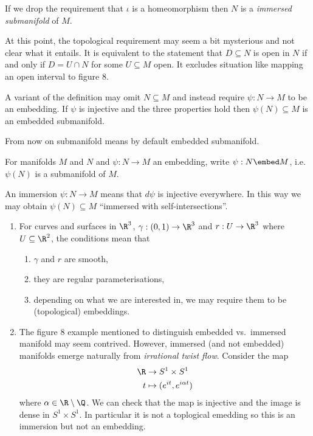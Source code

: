 \documentclass[a4paper]{article}
\begin{document}
\begin{definition}
  If we drop the requirement that \(\iota\) is a homeomorphism then \(N\) is a \emph{immersed submanifold} of \(M\).
\end{definition}

At this point, the topological requirement may seem a bit mysterious and not clear what it entails. It is equivalent to the statement that \(D \subseteq N\) is open in \(N\) if and only if \(D = U \cap N\) for some \(U \subseteq M\) open. It excludes situation like mapping an open interval to figure 8.

A variant of the definition may omit \(N \subseteq M\) and instead require \(\psi: N \to M\) to be an embedding. If \(\psi\) is injective and the three properties hold then \(\psi(N) \subseteq M\) is an embedded submanifold.

\begin{convention}
  From now on submanifold means by default embedded submanifold.
\end{convention}

\begin{notation}
  For manifolds \(M\) and \(N\) and \(\psi: N \to M\) an embedding, write \(\psi: N \embed M\), i.e.\ \(\psi(N)\) is a submanifold of \(M\).
\end{notation}

\begin{remark}
  An immersion \(\psi: N \to M\) means that \(d\psi\) is injective everywhere. In this way we may obtain \(\psi(N) \subseteq M\) ``immersed with self-intersections''.
\end{remark}

\begin{eg}\leavevmode
  \begin{enumerate}
  \item For curves and surfaces in \(\R^3\), \(\gamma: (0, 1) \to \R^3\) and \(r: U \to \R^3\) where \(U \subseteq \R^2\), the conditions mean that
    \begin{enumerate}
    \item \(\gamma\) and \(r\) are smooth,
    \item they are regular parameterisations,
    \item depending on what we are interested in, we may require them to be (topological) embeddings.
    \end{enumerate}
  \item The figure 8 example mentioned to distinguish embedded vs.\ immersed manifold may seem contrived. However, immersed (and not embedded) manifolds emerge naturally from \emph{irrational twist flow}. Consider the map
    \begin{align*}
      \R &\to S^1 \times S^1 \\
      t &\mapsto (e^{it}, e^{i\alpha t})
    \end{align*}
    where \(\alpha \in \R \setminus \Q\). We can check that the map is injective and the image is dense in \(S^1 \times S^1\). In particular it is not a toplogical emedding so this is an immersion but not an embedding.
  \end{enumerate}
\end{eg}
\end{document}
